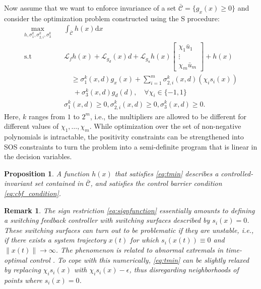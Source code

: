 \documentclass[conference]{IEEEtran}
\newtheorem{remark}{Remark}
\newtheorem{prop}{Proposition}
\begin{document}
Now assume that we want to enforce invariance of a set $\bar {\mathcal C} = \{ g_x(x) \geq 0 \}$ and consider the optimization problem constructed using the S procedure:
\begin{equation}
\label{eq:tmin}
\begin{aligned}
  \max_{h, \sigma^k_1, \sigma^k_{2,i}, \sigma^k_3} & \quad \int_{\bar {\mathcal C}} h(x) \mathrm{d} x \\
  \text{s.t} &  \quad \mathcal L_f h(x) + \mathcal L_{g_d}(x) d + \mathcal L_{g_u} h(x) \begin{bmatrix}
  	\chi_1 \bar u_1 \\
  	\vdots \\
  	\chi_m \bar u_m
  \end{bmatrix} + h(x) \\
  & \qquad \geq \sigma^k_1(x,d) g_x(x) + \sum_{i=1}^m \sigma^k_{2,i}(x,d) (\chi_i s_i(x)) \\
  & \qquad \;  + \sigma^k_3(x,d) g_d(d), \quad \forall \chi_i \in \{ -1,1 \} \\
  & \quad \sigma^k_1(x,d) \geq 0, \sigma^k_{2,i}(x,d) \geq 0, \sigma^k_3(x,d) \geq 0.
\end{aligned}
\end{equation}
Here, $k$ ranges from $1$ to $2^m$, i.e., the multipliers are allowed to be different for different values of $\chi_1, \ldots, \chi_m$. While optimization over the set of non-negative polynomials is intractable, the positivity constraints can be strengthened into SOS constraints to turn the problem into a semi-definite program that is linear in the decision variables.
 
\begin{prop}
  A function $h(x)$ that satisfies \eqref{eq:tmin} describes a controlled-invariant set contained in $\bar{\mathcal C}$, and satisfies the control barrier condition \eqref{eq:cbf_condition}.
\end{prop}

\begin{remark}
	The sign restriction \eqref{eq:signfunction} essentially amounts to defining a switching feedback controller with switching surfaces described by $s_i(x) = 0$. These switching surfaces can turn out to be problematic if they are \emph{unstable}, i.e., if there exists a system trajectory $x(t)$ for which $s_i(x(t)) \equiv 0$ and $\| x(t) \| \rightarrow \infty$. The phenomenon is related to \emph{abnormal extremals} in time-optimal control \cite{Boscain2004}. To cope with this numerically, \eqref{eq:tmin} can be slightly relaxed by replacing $\chi_i s_i(x)$ with $\chi_i s_i(x) - \epsilon$, thus disregarding neighborhoods of points where $s_i(x) = 0$.
\end{remark}
\end{document}
